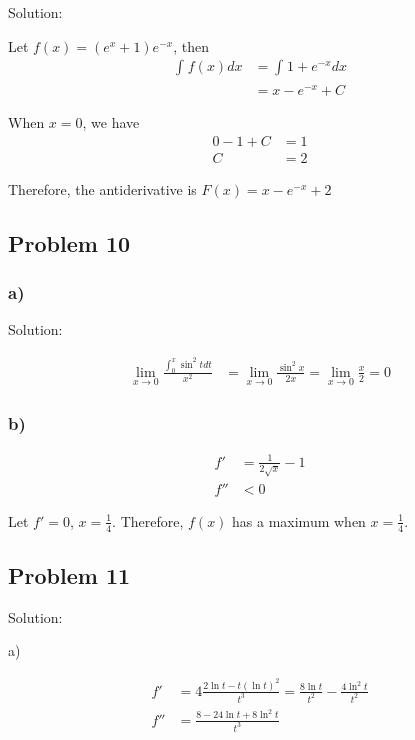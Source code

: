 \documentclass[letterpaper, 11pt]{article}
\newcommand{\1}{\mathds{1}}	%
\theoremstyle{definition}
\begin{document}
  Solution:

  Let $f(x) = (e ^{x} + 1) e ^{-x}$, then
  \begin{align*}
    \int_{}^{} f(x) dx & = \int_{}^{} 1 + e ^{-x} dx \\
                       & = x - e ^{-x} + C
  \end{align*}

  When $x = 0$, we have \begin{align*}
    0 - 1 + C & = 1 \\
    C         & = 2
  \end{align*}

  Therefore, the antiderivative is $F(x) = x - e ^{ -x } + 2$

  \subsection*{Problem 10}

  \subsubsection*{a)}

  Solution:

  \begin{align*}
    \lim_{x \to 0}\frac{\int_{0}^{x}\sin ^{2} t dt}{x ^{2}} & =\lim_{x \to 0} \frac{\sin ^{2} x}{2x} = \lim_{x \to 0} \frac{x}{2} = 0
  \end{align*}

  \subsubsection*{b)}

  \begin{align*}
    f'  & = \frac{1}{2 \sqrt{x}} - 1 \\
    f'' & < 0
  \end{align*}

  Let $f' = 0$, $x = \frac{1}{4}$. Therefore, $f(x)$ has a maximum when $x = \frac{1}{4}$.


  \subsection*{Problem 11}

  Solution:

  a)

  \begin{align*}
    f'  & = 4 \frac{2 \ln t - t (\ln t) ^{2}}{t ^{3}} = \frac{8 \ln t}{t ^{2}} - \frac{4 \ln ^{2} t}{t ^{2}} \\
    f'' & = \frac{8 - 24 \ln t + 8 \ln ^{2} t}{t ^{3}}
  \end{align*}
\end{document}
